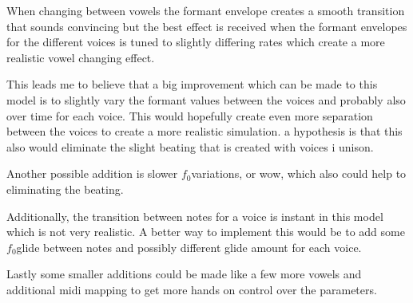 \documentclass{article}
\newcommand{\fo}{$f_0$}
\begin{document}
When changing between vowels the formant envelope creates a smooth transition that sounds convincing but the best effect is received when the formant envelopes for the different voices is tuned to slightly differing rates which create a more realistic vowel changing effect.

This leads me to believe that a big improvement which can be made to this model is to slightly vary the formant values between the voices and probably also over time for each voice. This would hopefully create even more separation between the voices to create a more realistic simulation. a hypothesis is that this also would eliminate the slight beating that is created with voices i unison.

Another possible addition is slower \fo  variations, or wow, which also could help to eliminating the beating.

Additionally, the transition between notes for a voice is instant in this model which is not very realistic. A better way to implement this would be to add some \fo  glide between notes and possibly different glide amount for each voice.

Lastly some smaller additions could be made like a few more vowels and additional midi mapping to get more hands on control over the parameters.


\end{document}
